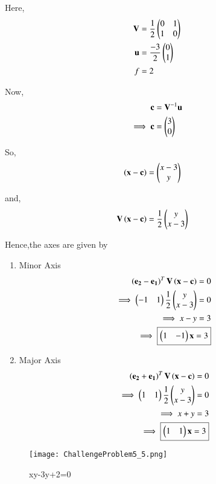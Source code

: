 \documentclass[journal,12pt,twocolumn]{IEEEtran}
\begin{document}
\begin{enumerate}
    Here,
    \begin{align}
    \mathbf{V} &= \frac{1}{2}\begin{pmatrix}0 & 1 \\ 1 & 0\end{pmatrix} \\
    \mathbf{u} &= \frac{-3}{2}\begin{pmatrix}0 \\ 1\end{pmatrix} \\
    f &= 2
    \end{align}

    Now,
    \begin{align}
    \mathbf{c} &= \mathbf{V}^{-1}\mathbf{u}\\
    \implies \mathbf{c} &= \begin{pmatrix}3 \\ 0\end{pmatrix}
    \end{align}

    So,
    \begin{align}
    \left(\mathbf{x}-\mathbf{c}\right) &= \begin{pmatrix}x-3 \\ y\end{pmatrix}
    \end{align}

    and,
    \begin{align}
    \mathbf{V}\left(\mathbf{x}-\mathbf{c}\right) &= \frac{1}{2}\begin{pmatrix}y \\ x-3\end{pmatrix}
    \end{align}

    Hence,the axes are given by
    \begin{enumerate}
    \item Minor Axis
    \begin{align}
    \left(\mathbf{e_2}-\mathbf{e_1}\right)^T\mathbf{V}\left(\mathbf{x}-\mathbf{c}\right) = 0 \\
    \implies \begin{pmatrix}-1 & 1\end{pmatrix}\frac{1}{2}\begin{pmatrix}y \\ x-3\end{pmatrix} = 0 \\
    \implies x-y = 3 \\
    \implies \boxed{\begin{pmatrix}1 & -1\end{pmatrix}\mathbf{x} = 3}
    \end{align}
    
    \item Major Axis
    \begin{align}
    \left(\mathbf{e_2}+\mathbf{e_1}\right)^T\mathbf{V}\left(\mathbf{x}-\mathbf{c}\right) = 0 \\
    \implies \begin{pmatrix}1 & 1\end{pmatrix}\frac{1}{2}\begin{pmatrix}y \\ x-3\end{pmatrix} = 0 \\
    \implies x+y = 3 \\
    \implies \boxed{\begin{pmatrix}1 & 1\end{pmatrix}\mathbf{x} = 3}
    \end{align}
    \end{enumerate}

    \begin{figure}[!ht]
    \centering
    \texttt{[image: ChallengeProblem5\_5.png]}
    \caption{xy-3y+2=0}
    \label{ex5}	
    \end{figure}
    
\end{enumerate}
\end{document}
